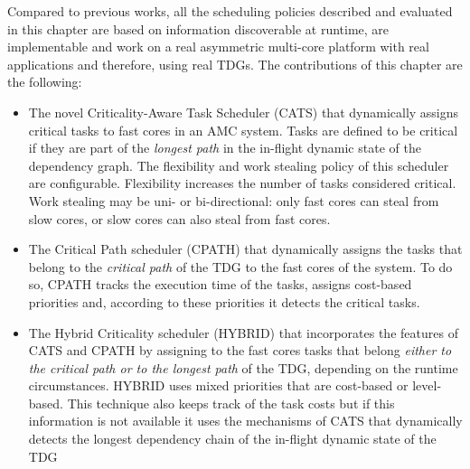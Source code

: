 Compared to previous works, all the scheduling policies described and evaluated in this chapter are based on information discoverable at runtime, are implementable and work on a real asymmetric multi-core platform with real applications and therefore, using real TDGs.
The contributions of this chapter are the following: 
\begin{itemize}
 \item{The novel Criticality-Aware Task Scheduler (CATS) that dynamically assigns critical tasks to fast cores in an AMC system. Tasks are defined to be critical if they are part of the \textit{longest path} in the in-flight dynamic state of the dependency graph. The flexibility and work stealing policy of this scheduler are configurable. Flexibility increases the number of tasks considered critical. Work stealing may be uni- or bi-directional: only fast cores can steal from slow cores, or slow cores can also steal from fast cores.}
 \item{The Critical Path scheduler (CPATH) that dynamically assigns the tasks that belong to the \textit{critical path} of the TDG to the fast cores of the system. To do so, CPATH tracks the execution time of the tasks, assigns cost-based priorities and, according to these priorities it detects the critical tasks.}
 \item{The Hybrid Criticality scheduler (HYBRID) that incorporates the features of CATS and CPATH by assigning to the fast cores tasks that belong \textit{either to the critical path or to the longest path} of the TDG, depending on the runtime circumstances. HYBRID uses mixed priorities that are cost-based or level-based. This technique also keeps track of the task costs but if this information is not available it uses the mechanisms of CATS that dynamically detects the longest dependency chain of the in-flight dynamic state of the TDG}
 

\end{itemize}
